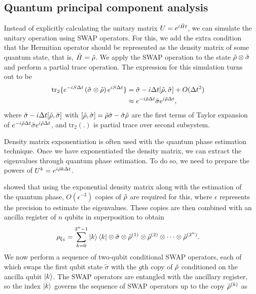 \documentclass[10pt]{article}
\begin{document}
	\subsection{\label{sec: QPCA} Quantum principal component analysis}
	Instead of explicitly calculating the unitary matrix $U=e^{\dot{\iota} \Tilde{H} t}$, we can simulate the unitary operation using SWAP operators. For this, we add the extra condition that the Hermitian operator should be represented as the density matrix of some quantum state, that is, $\Tilde{H}=\Tilde{\rho}$. We apply the SWAP operation to the state $\Tilde{\rho}\otimes \tilde{\sigma}$ and perform a partial trace operation.  The expression for this simulation turns out to be \citep{Lloyd2014QPCA, Schuld2021QML}
	\begin{equation}
		\begin{split}    
			\mathrm{tr}_{2}\{e^{-\dot{\iota}S\Delta t}\left(\tilde{\sigma}\otimes \Tilde{\rho}\right)e^{\dot{\iota}S\Delta t}\}&={\tilde{\sigma}}-\dot{\iota}\Delta t[\Tilde{\rho},{\tilde{\sigma}}]+O(\Delta t^{2})\nonumber \\ &\approx e^{-\dot{\iota}\Tilde{\rho}\Delta t}{\tilde{\sigma}} e^{\dot{\iota}\Tilde{\rho}\Delta t},
		\end{split}
	\end{equation}
	where ${\tilde{\sigma}}-\dot{\iota}\Delta t[\Tilde{\rho},{\tilde{\sigma}}]$ with  $[\Tilde{\rho},{\tilde{\sigma}}]=\Tilde{\rho}{\tilde{\sigma}}-{\tilde{\sigma}} \Tilde{\rho}$ are the first terms of Taylor expansion of $e^{-\dot{\iota}\Tilde{\rho}\Delta t}{\tilde{\sigma}} e^{\dot{\iota}\Tilde{\rho}\Delta t}$, and $\mathrm{tr}_{2}(.)$ is partial trace over second subsystem.
	
	Density matrix exponentiation is often used with the quantum phase estimation technique. Once we have exponentiated the density matrix, we can extract the eigenvalues through quantum phase estimation. To do so, we need to prepare the powers of $U^{k}=e^{\dot{\iota}\Tilde{\rho} k \Delta t}$.
	
	\citet{Lloyd2014QPCA} showed that using the exponential density matrix along with the estimation of the quantum phase, $O(\epsilon^{-3})$ copies of $\Tilde{\rho}$ are required for this, where $\epsilon$  represents the precision to estimate the eigenvalues. These copies are then combined with an ancilla register of $n$ qubits in superposition to obtain
	\begin{equation}
		\rho_{\xi_4}=\sum_{k=0}^{2^{n}-1}\ket{k}\bra{k} \otimes {\tilde{\sigma}} \otimes \Tilde{\rho}^{(1)} \otimes \Tilde{\rho}^{(2)} \otimes \cdots \otimes \Tilde{\rho}^{(2^{n})}.
	\end{equation}
	We now perform a sequence of two-qubit conditional SWAP operators, each of which swaps the first qubit state ${\tilde{\sigma}}$ with the $g$th copy of $\Tilde{\rho}$ conditioned on the ancilla qubit $\ket{k}$. The SWAP operators are entangled with the ancillary register, so the index $\ket{k}$ governs the sequence of SWAP operators up to the copy $\Tilde{\rho}^{(k)}$ as
	
\end{document}
